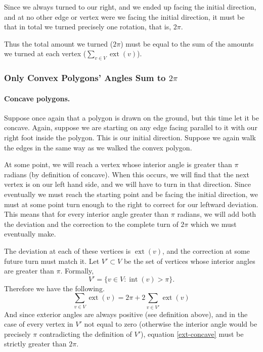 \documentclass{article}
\newcommand{\inta}[1]{\operatorname{int}\left( #1 \right)} %
\newcommand{\exta}[1]{\operatorname{ext}\left( #1 \right)} %
\begin{document}
Since we always turned to our right, and we ended up facing the initial direction, and at no other edge or vertex were we facing the initial direction, it must be that in total we turned precisely one rotation, that is, \(2\pi\).

Thus the total amount we turned (\(2\pi\)) must be equal to the sum of the amounts we turned at each vertex (\(\sum_{v \in V}\exta{v}\)).

\subsubsection{Only Convex Polygons' Angles Sum to \(2\pi\)}

\paragraph{Concave polygons.} Suppose once again that a polygon is drawn on the ground, but this time let it be concave. Again, suppose we are starting on any edge facing parallel to it with our right foot inside the polygon. This is our initial direction. Suppose we again walk the edges in the same way as we walked the convex polygon.

At some point, we will reach a vertex whose interior angle is greater than \(\pi\) radians (by definition of concave). When this occurs, we will find that the next vertex is on our left hand side, and we will have to turn in that direction. Since eventually we must reach the starting point and be facing the initial direction, we must at some point turn enough to the right to correct for our leftward deviation. This means that for every interior angle greater than \(\pi\) radians, we will add both the deviation and the correction to the complete turn of \(2\pi\) which we must eventually make.

The deviation at each of these vertices is \(\exta{v}\), and the correction at some future turn must match it. Let \(V' \subset V\) be the set of vertices whose interior angles are greater than \(\pi\). Formally,
\begin{equation}
	V' = \{ v \in V : \inta{v} > \pi \}.
\end{equation}
Therefore we have the following.
\begin{equation}
	\sum_{v \in V} \exta{v} = 2\pi + 2\sum_{v \in V'} \exta{v}
	\label{ext-concave}
\end{equation}
And since exterior angles are always positive (see definition above), and in the case of every vertex in \(V'\) not equal to zero (otherwise the interior angle would be precisely \(\pi\) contradicting the definition of \(V'\)), equation \ref{ext-concave} must be strictly greater than \(2\pi\).
\end{document}

